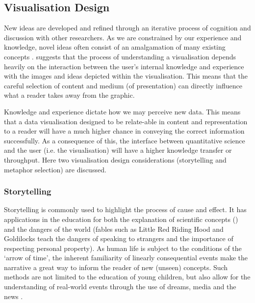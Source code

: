 \subsection{Visualisation Design}\label{sec:visdes}


New ideas are developed and refined through an iterative process of cognition and discussion with other researchers\cite{ch7}. 
As we are constrained by our experience and knowledge, novel ideas often consist of an amalgamation of many existing concepts \cite{wingedhorse,goodideas}. \cite{shapinginfo} suggests that the process of understanding a visualisation depends heavily on the interaction between the user's internal knowledge and experience with the images and ideas depicted within the visualisation. This means that the careful selection of content and medium (of presentation) can directly influence what a reader takes away from the graphic.

Knowledge and experience dictate how we may perceive new data. This means that a data visualisation designed to be relate-able in content and representation to a reader will have a much higher chance in conveying the correct information successfully. As a consequence of this, the interface between quantitative science and the user (i.e. the visualisation) will have a higher knowledge transfer or throughput. Here two visualisation design considerations (storytelling and metaphor selection) are discussed. 



\subsubsection{Storytelling}\label{sec:storytelling}

Storytelling is commonly used to highlight the process of cause and effect. It has applications in the education for both the explanation of scientific concepts (\cite{marsstory}) and the dangers of the world (fables such as Little Red Riding Hood and Goldilocks teach the dangers of speaking to strangers and the importance of respecting personal property). As human life is subject to the conditions of the `arrow of time', the inherent familiarity of linearly consequential events make the narrative a great way to inform the reader of new (unseen) concepts. Such methods are not limited to the education of young children, but also allow for the understanding of real-world events through the use of dreams, media and the news \cite{storyanimal,dream}. 

